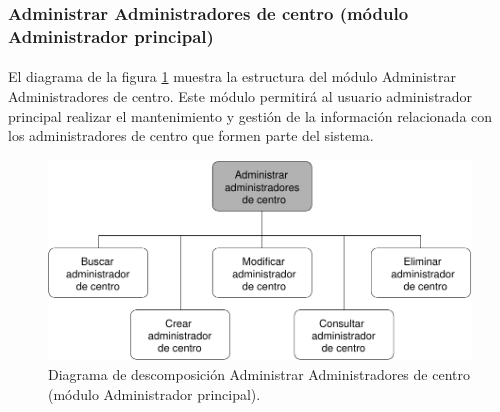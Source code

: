 \subsubsection{Administrar Administradores de centro (módulo Administrador principal)}

  \paragraph{}El diagrama de la figura
  \ref{diagramaDescomposicionAdministrarAdministradoresCentro} muestra la
  estructura del módulo Administrar Administradores de centro. Este módulo
  permitirá al usuario administrador principal realizar el mantenimiento y
  gestión de la información relacionada con los administradores de centro que
  formen parte del sistema.


  \begin{figure}[!ht]
    \begin{center}
      \includegraphics[]{11.Disenyo_Arquitectonico/11.2.Diagramas_Descomposicion/11.2.2.Modulo_administrador_principal/AdministrarBBDD/AdministrarUsuarios/AdministrarAdministradoresCentro/Diagramas/administrar_administradores_centro.pdf}
      \caption{Diagrama de descomposición Administrar Administradores de centro (módulo Administrador principal).}
      \label{diagramaDescomposicionAdministrarAdministradoresCentro}
    \end{center}
  \end{figure}
